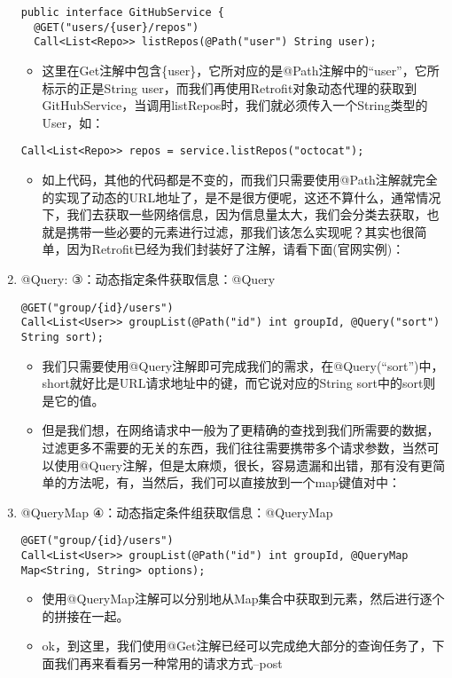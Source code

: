 \documentclass[9pt, b5paper]{article}
\begin{document}
\begin{enumerate}
\begin{verbatim}
public interface GitHubService {
  @GET("users/{user}/repos")
  Call<List<Repo>> listRepos(@Path("user") String user);
\end{verbatim}
\begin{itemize}
\item 这里在Get注解中包含\{user\}，它所对应的是@Path注解中的“user”，它所标示的正是String user，而我们再使用Retrofit对象动态代理的获取到GitHubService，当调用listRepos时，我们就必须传入一个String类型的User，如：
\end{itemize}
\begin{verbatim}
Call<List<Repo>> repos = service.listRepos("octocat");
\end{verbatim}
\begin{itemize}
\item 如上代码，其他的代码都是不变的，而我们只需要使用@Path注解就完全的实现了动态的URL地址了，是不是很方便呢，这还不算什么，通常情况下，我们去获取一些网络信息，因为信息量太大，我们会分类去获取，也就是携带一些必要的元素进行过滤，那我们该怎么实现呢？其实也很简单，因为Retrofit已经为我们封装好了注解，请看下面(官网实例)：
\end{itemize}
\item @Query: ③：动态指定条件获取信息：@Query
\label{sec-1-2-1-3}
\begin{verbatim}
@GET("group/{id}/users")
Call<List<User>> groupList(@Path("id") int groupId, @Query("sort") String sort);
\end{verbatim}
\begin{itemize}
\item 我们只需要使用@Query注解即可完成我们的需求，在@Query(“sort”)中，short就好比是URL请求地址中的键，而它说对应的String sort中的sort则是它的值。
\item 但是我们想，在网络请求中一般为了更精确的查找到我们所需要的数据，过滤更多不需要的无关的东西，我们往往需要携带多个请求参数，当然可以使用@Query注解，但是太麻烦，很长，容易遗漏和出错，那有没有更简单的方法呢，有，当然后，我们可以直接放到一个map键值对中：
\end{itemize}
\item @QueryMap ④：动态指定条件组获取信息：@QueryMap
\label{sec-1-2-1-4}
\begin{verbatim}
@GET("group/{id}/users")
Call<List<User>> groupList(@Path("id") int groupId, @QueryMap Map<String, String> options);
\end{verbatim}
\begin{itemize}
\item 使用@QueryMap注解可以分别地从Map集合中获取到元素，然后进行逐个的拼接在一起。
\item ok，到这里，我们使用@Get注解已经可以完成绝大部分的查询任务了，下面我们再来看看另一种常用的请求方式–post
\end{itemize}
\end{enumerate}
\end{document}
